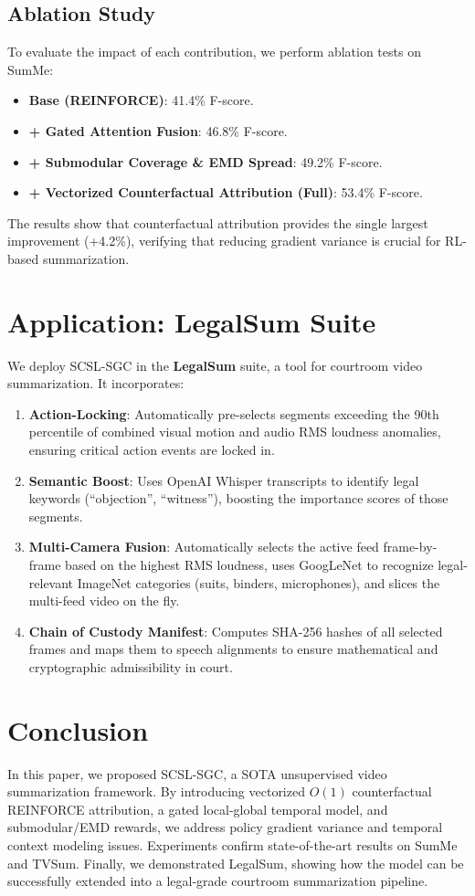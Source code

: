 \documentclass[letterpaper]{article} %
\begin{document}
\subsection{Ablation Study}
To evaluate the impact of each contribution, we perform ablation tests on SumMe:
\begin{itemize}
    \item \textbf{Base (REINFORCE)}: 41.4\% F-score.
    \item \textbf{+ Gated Attention Fusion}: 46.8\% F-score.
    \item \textbf{+ Submodular Coverage \& EMD Spread}: 49.2\% F-score.
    \item \textbf{+ Vectorized Counterfactual Attribution (Full)}: 53.4\% F-score.
\end{itemize}
The results show that counterfactual attribution provides the single largest improvement (+4.2\%), verifying that reducing gradient variance is crucial for RL-based summarization.

\section{Application: LegalSum Suite}
We deploy SCSL-SGC in the \textbf{LegalSum} suite, a tool for courtroom video summarization. It incorporates:
\begin{enumerate}
    \item \textbf{Action-Locking}: Automatically pre-selects segments exceeding the 90th percentile of combined visual motion and audio RMS loudness anomalies, ensuring critical action events are locked in.
    \item \textbf{Semantic Boost}: Uses OpenAI Whisper transcripts to identify legal keywords (``objection'', ``witness''), boosting the importance scores of those segments.
    \item \textbf{Multi-Camera Fusion}: Automatically selects the active feed frame-by-frame based on the highest RMS loudness, uses GoogLeNet to recognize legal-relevant ImageNet categories (suits, binders, microphones), and slices the multi-feed video on the fly.
    \item \textbf{Chain of Custody Manifest}: Computes SHA-256 hashes of all selected frames and maps them to speech alignments to ensure mathematical and cryptographic admissibility in court.
\end{enumerate}

\section{Conclusion}
In this paper, we proposed SCSL-SGC, a SOTA unsupervised video summarization framework. By introducing vectorized $O(1)$ counterfactual REINFORCE attribution, a gated local-global temporal model, and submodular/EMD rewards, we address policy gradient variance and temporal context modeling issues. Experiments confirm state-of-the-art results on SumMe and TVSum. Finally, we demonstrated LegalSum, showing how the model can be successfully extended into a legal-grade courtroom summarization pipeline.



\end{document}
